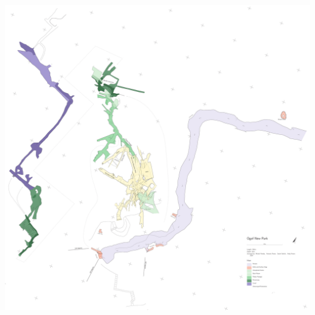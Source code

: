 \documentclass[a1paper,landscape]{article}
\begin{document}
\hfill
\begin{minipage}{0.8\textwidth}
    \includegraphics[height=\paperheight,keepaspectratio]{../../out/print.pdf}
\end{minipage}
\end{document}
